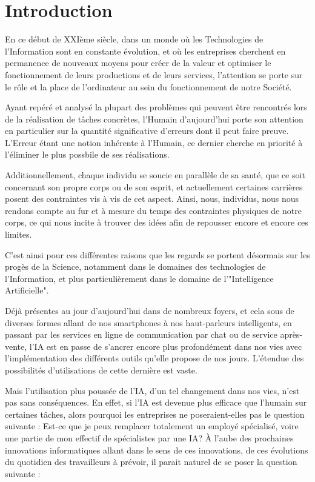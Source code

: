 \chapter*{Introduction}

En ce début de XXIème siècle, dans un monde où les Technologies de l'Information sont en constante évolution,
et où les entreprises cherchent en permanence de nouveaux moyens pour créer de la valeur
et optimiser le fonctionnement de leurs productions et de leurs services, l'attention se porte sur le rôle et la place de l'ordinateur au sein du fonctionnement de notre Société.\newline

Ayant repéré et analysé la plupart des problèmes qui peuvent être rencontrés lors de la réalisation de tâches concrètes, l'Humain d'aujourd'hui
porte son attention en particulier sur la quantité significative d'erreurs dont il peut faire preuve.
L'Erreur étant une notion inhérente à l'Humain, ce dernier cherche en priorité à l'éliminer le plus possbile de ses réalisations.\newline

Additionnellement, chaque individu se soucie en parallèle de sa santé, que ce soit concernant son propre corps ou de son esprit,
et actuellement certaines carrières posent des contraintes vis à vis de cet aspect.
Ainsi, nous, individus, nous nous rendons compte au fur et à mesure du temps des contraintes physiques de notre corps, ce qui nous incite à trouver des
idées afin de repousser encore et encore ces limites.\newline

C'est ainsi pour ces différentes raisons que les regards se portent désormais sur les progès de la Science, notamment dans le domaines des technologies de l'Information,
et plus particulièrement dans le domaine de l'"Intelligence Artificielle".\newline

Déjà présentes au jour d'aujourd'hui dans de nombreux foyers, et cela sous de diverses formes allant de nos smartphones à nos haut-parleurs intelligents,
en passant par les services en ligne de communication par chat ou de service après-vente, l'IA est en passe de s'ancrer encore plus profondément dans nos vies
avec l'implémentation des différents outils qu'elle propose de nos jours. L'étendue des possibilités d'utilisations de cette dernière est vaste.\newline

Mais l'utilisation plus poussée de l'IA, d'un tel changement dans nos vies, n'est pas sans conséquences. En effet, si l'IA est devenue plus efficace que l'humain sur certaines tâches,
alors pourquoi les entreprises ne poseraient-elles pas le question suivante : Est-ce que je peux remplacer totalement un employé spécialisé, voire une partie de mon effectif de spécialistes par une IA?
À l'aube des prochaines innovations informatiques allant dans le sens de ces innovations, de ces évolutions du quotidien des travailleurs à prévoir, il parait naturel de se poser la question suivante :\newline

